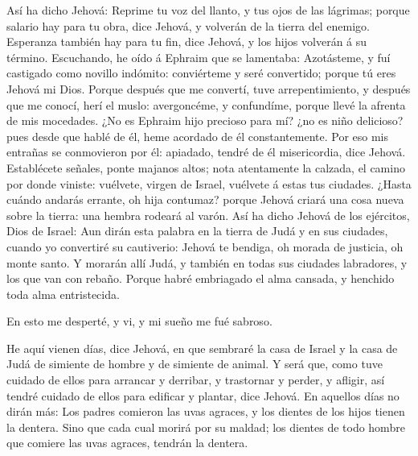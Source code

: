  Así ha dicho Jehová: Reprime tu voz del llanto, y tus ojos
de las lágrimas; porque salario hay para tu obra, dice Jehová, y
volverán de la tierra del enemigo.  Esperanza también hay
para tu fin, dice Jehová, y los hijos volverán á su término.
 Escuchando, he oído á Ephraim que se lamentaba:
Azotásteme, y fuí castigado como novillo indómito: conviérteme y seré
convertido; porque tú eres Jehová mi Dios.  Porque después
que me convertí, tuve arrepentimiento, y después que me conocí, herí el
muslo: avergoncéme, y confundíme, porque llevé la afrenta de mis
mocedades.  ¿No es Ephraim hijo precioso para mí? ¿no es
niño delicioso? pues desde que hablé de él, heme acordado de él
constantemente. Por eso mis entrañas se conmovieron por él: apiadado,
tendré de él misericordia, dice Jehová.  Establécete
señales, ponte majanos altos; nota atentamente la calzada, el camino por
donde viniste: vuélvete, virgen de Israel, vuélvete á estas tus
ciudades.  ¿Hasta cuándo andarás errante, oh hija contumaz?
porque Jehová criará una cosa nueva sobre la tierra: una hembra rodeará
al varón.  Así ha dicho Jehová de los ejércitos, Dios de
Israel: Aun dirán esta palabra en la tierra de Judá y en sus ciudades,
cuando yo convertiré su cautiverio: Jehová te bendiga, oh morada de
justicia, oh monte santo.  Y morarán allí Judá, y también
en todas sus ciudades labradores, y los que van con rebaño.
 Porque habré embriagado el alma cansada, y henchido toda
alma entristecida.

 En esto me desperté, y vi, y mi sueño me fué sabroso.

 He aquí vienen días, dice Jehová, en que sembraré la casa
de Israel y la casa de Judá de simiente de hombre y de simiente de
animal.  Y será que, como tuve cuidado de ellos para
arrancar y derribar, y trastornar y perder, y afligir, así tendré
cuidado de ellos para edificar y plantar, dice Jehová.  En
aquellos días no dirán más: Los padres comieron las uvas agraces, y los
dientes de los hijos tienen la dentera.  Sino que cada cual
morirá por su maldad; los dientes de todo hombre que comiere las uvas
agraces, tendrán la dentera.


